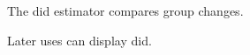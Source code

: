 \documentclass{article}
\begin{document}
The \gls{did} estimator compares group changes.

Later uses can display \gls{did}.
\printnoidxglossary[type=\acronymtype,title={Glossary}]
\end{document}
